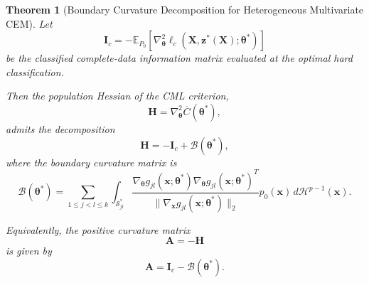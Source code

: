 \documentclass[pdflatex,sn-mathphys-ay]{sn-jnl}%
\let\oldtheta\theta
\renewcommand{\theta}{\boldsymbol{\oldtheta}}
\theoremstyle{thmstyleone}%
\newtheorem{theorem}{Theorem}%
\theoremstyle{thmstyletwo}%
\theoremstyle{thmstylethree}%
\begin{document}
\begin{theorem}[Boundary Curvature Decomposition for Heterogeneous Multivariate CEM]
Let
\[
    \mathbf{I}_c
    =
    -
    \mathbb{E}_{P_0}
    \left[
        \nabla_{\boldsymbol{\theta}}^2
        \ell_c
        (\mathbf{X},\mathbf{z}^*(\mathbf{X});\boldsymbol{\theta}^*)
    \right]
\]
be the classified complete-data information matrix evaluated at the optimal hard classification.

Then the population Hessian of the CML criterion,
\[
    \mathbf{H}
    =
    \nabla_{\boldsymbol{\theta}}^2
    \overline{C}
    (\boldsymbol{\theta}^*),
\]
admits the decomposition
\[
    \mathbf{H}
    =
    -\mathbf{I}_c
    +
    \mathcal{B}
    (\boldsymbol{\theta}^*),
\]
where the boundary curvature matrix is
\[
    \mathcal{B}
    (\boldsymbol{\theta}^*)
    =
    \sum_{1\leq j<l\leq k}
    \int_{\mathcal{S}_{jl}^*}
    \frac{
        \nabla_{\boldsymbol{\theta}}
        g_{jl}
        (\mathbf{x};\boldsymbol{\theta}^*)
        \nabla_{\boldsymbol{\theta}}
        g_{jl}
        (\mathbf{x};\boldsymbol{\theta}^*)^T
    }{
        \|
            \nabla_{\mathbf{x}}
            g_{jl}
            (\mathbf{x};\boldsymbol{\theta}^*)
        \|_2
    }
    p_0(\mathbf{x})
    \,
    d\mathcal{H}^{p-1}(\mathbf{x}).
\]

Equivalently, the positive curvature matrix
\[
    \mathbf{A}
    =
    -\mathbf{H}
\]
is given by
\[
    \mathbf{A}
    =
    \mathbf{I}_c
    -
    \mathcal{B}
    (\boldsymbol{\theta}^*).
\]

\end{theorem}
\end{document}
